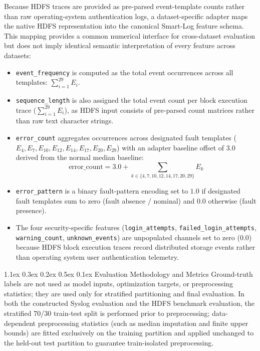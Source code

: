 \documentclass[10pt,conference]{IEEEtran}
\makeatletter
\renewcommand\subsection{\@startsection{subsection}{2}{\z@}%
  {1.1ex \@plus 0.3ex \@minus 0.2ex}%
  {0.5ex \@plus 0.1ex}%
  {\normalfont\fontsize{12pt}{14.4pt}\selectfont\bfseries}}
\makeatother
\begin{document}
Because HDFS traces are provided as pre-parsed event-template counts rather than raw operating-system authentication logs, a dataset-specific adapter maps the native HDFS representation into the canonical Smart-Log feature schema. This mapping provides a common numerical interface for cross-dataset evaluation but does not imply identical semantic interpretation of every feature across datasets:
\begin{itemize}
\item \texttt{event\_frequency} is computed as the total event occurrences across all templates: $\sum_{i=1}^{29} E_i$.
\item \texttt{sequence\_length} is also assigned the total event count per block execution trace ($\sum_{i=1}^{29} E_i$), as HDFS input consists of pre-parsed count matrices rather than raw text character strings.
\item \texttt{error\_count} aggregates occurrences across designated fault templates ($E_4, E_7, E_{10}, E_{12}, E_{14}, E_{17}, E_{20}, E_{29}$) with an adapter baseline offset of $3.0$ derived from the normal median baseline:
\begin{equation}
\text{error\_count} = 3.0 + \sum_{k \in \{4,7,10,12,14,17,20,29\}} E_k
\end{equation}
\item \texttt{error\_pattern} is a binary fault-pattern encoding set to $1.0$ if designated fault templates sum to zero (fault absence / nominal) and $0.0$ otherwise (fault presence).
\item The four security-specific features (\texttt{login\_attempts}, \texttt{failed\_login\_attempts}, \texttt{warning\_count}, \texttt{unknown\_events}) are unpopulated channels set to zero ($0.0$) because HDFS block execution traces record distributed storage events rather than operating system user authentication telemetry.
\end{itemize}

\subsection{Evaluation Methodology and Metrics}
Ground-truth labels are not used as model inputs, optimization targets, or preprocessing statistics; they are used only for stratified partitioning and final evaluation. In both the constructed Syslog evaluation and the HDFS benchmark evaluation, the stratified 70/30 train-test split is performed prior to preprocessing; data-dependent preprocessing statistics (such as median imputation and finite upper bounds) are fitted exclusively on the training partition and applied unchanged to the held-out test partition to guarantee train-isolated preprocessing.
\end{document}
